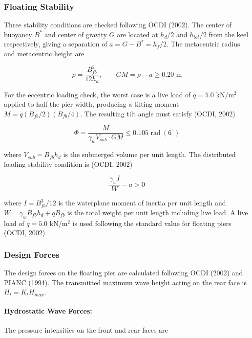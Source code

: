 \documentclass[a4paper, 11pt]{article}
\begin{document}
\subsubsection{Floating Stability}

\hspace*{0.5cm} Three stability conditions are checked following OCDI (2002). The center of buoyancy $B^*$ and center of gravity $G$ are located at $h_d/2$ and $h_{tot}/2$ from the keel respectively, giving a separation of $a = G - B^* = h_f/2$. The metacentric radius and metacentric height are

\begin{equation}
    \rho = \frac{B_{fb}^2}{12h_d}, \qquad GM = \rho - a \geq 0.20 \text{ m}
\end{equation}

For the eccentric loading check, the worst case is a live load of $q = 5.0$ kN/m$^2$ applied to half the pier width, producing a tilting moment $M = q(B_{fb}/2)(B_{fb}/4)$. The resulting tilt angle must satisfy (OCDI, 2002)

\begin{equation}
    \Phi = \frac{M}{\gamma_w V_{sub} \cdot GM} \leq 0.105 \text{ rad} \ (6^{\circ})
\end{equation}

where $V_{sub} = B_{fb} h_d$ is the submerged volume per unit length. The distributed loading stability condition is (OCDI, 2002)

\begin{equation}
    \frac{\gamma_w I}{W} - a > 0
\end{equation}

where $I = B_{fb}^3/12$ is the waterplane moment of inertia per unit length and $W = \gamma_w B_{fb} h_d + q B_{fb}$ is the total weight per unit length including live load. A live load of $q = 5.0$ kN/m$^2$ is used following the standard value for floating piers (OCDI, 2002).

\subsubsection{Design Forces}

\hspace*{0.5cm} The design forces on the floating pier are calculated following OCDI (2002) and PIANC (1994). The transmitted maximum wave height acting on the rear face is $H_t = K_t H_{max}$.

\paragraph{Hydrostatic Wave Forces:} The pressure intensities on the front and rear faces are
\end{document}

